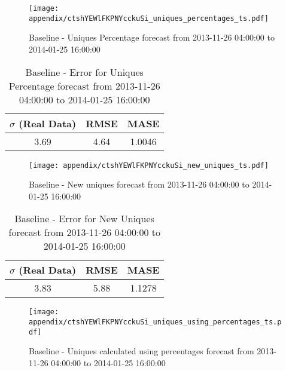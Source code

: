 \begin{figure}[H] \begin{center} \leavevmode
\texttt{[image: appendix/ctshYEWlFKPNYcckuSi\_uniques\_percentages\_ts.pdf]} \caption{
Baseline - Uniques Percentage forecast from 2013-11-26 04:00:00 to 2014-01-25 16:00:00} \label{fig:appendix/ctshYEWlFKPNYcckuSi_uniques_percentages_ts.pdf} \end{center}
\end{figure}

\begin{table}[H]
\centering
\footnotesize
\begin{tabular}{ccc}
$\sigma$ (Real Data) & RMSE & MASE   \\ \hline
3.69 & 4.64 & 1.0046 \\
\end{tabular}

\vspace{0.5cm}

\caption{
Baseline - Error for Uniques Percentage forecast from 2013-11-26 04:00:00 to 2014-01-25 16:00:00}
\end{table}

\begin{figure}[H] \begin{center} \leavevmode
\texttt{[image: appendix/ctshYEWlFKPNYcckuSi\_new\_uniques\_ts.pdf]} \caption{
Baseline - New uniques forecast from 2013-11-26 04:00:00 to 2014-01-25 16:00:00} \label{fig:appendix/ctshYEWlFKPNYcckuSi_new_uniques_ts.pdf} \end{center}
\end{figure}

\begin{table}[H]
\centering
\footnotesize
\begin{tabular}{ccc}
$\sigma$ (Real Data) & RMSE & MASE   \\ \hline
3.83 & 5.88 & 1.1278 \\
\end{tabular}

\vspace{0.5cm}

\caption{
Baseline - Error for New Uniques forecast from 2013-11-26 04:00:00 to 2014-01-25 16:00:00}
\end{table}

\begin{figure}[H] \begin{center} \leavevmode
\texttt{[image: appendix/ctshYEWlFKPNYcckuSi\_uniques\_using\_percentages\_ts.pdf]} \caption{
Baseline - Uniques calculated using percentages forecast from 2013-11-26 04:00:00 to 2014-01-25 16:00:00} \label{fig:appendix/ctshYEWlFKPNYcckuSi_uniques_using_percentages_ts.pdf} \end{center}
\end{figure}

